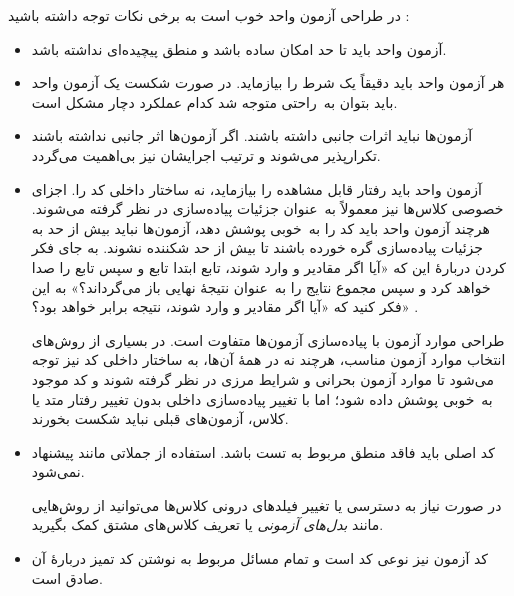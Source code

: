 \documentclass{utap}
\begin{document}
    \par در طراحی آزمون واحد خوب است به برخی نکات توجه داشته باشید \cite{dietrich14}:
    \begin{itemize}[nosep]
        \item آزمون واحد باید تا حد امکان ساده باشد و منطق پیچیده‌ای نداشته باشد.
        \item هر آزمون واحد باید دقیقاً یک شرط را بیازماید. در صورت شکست یک آزمون واحد باید بتوان به~راحتی متوجه شد کدام عملکرد دچار مشکل است.
        \item آزمون‌ها نباید اثرات جانبی داشته باشند. اگر آزمون‌ها اثر جانبی نداشته باشند تکرارپذیر می‌شوند و ترتیب اجرایشان نیز بی‌اهمیت می‌گردد.
        \item آزمون واحد باید رفتار قابل مشاهده را بیازماید، نه ساختار داخلی کد را. اجزای خصوصی کلاس‌ها نیز معمولاً به~عنوان جزئیات پیاده‌سازی در نظر گرفته می‌شوند.
        هرچند آزمون واحد باید کد را به~خوبی پوشش دهد، آزمون‌ها نباید بیش از حد به جزئیات پیاده‌سازی گره خورده باشند تا بیش از حد شکننده نشوند. به جای فکر کردن دربارهٔ  این که «آیا اگر مقادیر  و  وارد شوند، تابع ابتدا تابع  و سپس تابع  را صدا خواهد کرد و سپس مجموع نتایج را به~عنوان نتیجهٔ نهایی باز می‌گرداند؟» به این فکر کنید که «آیا اگر مقادیر  و  وارد شوند، نتیجه برابر  خواهد بود؟» \cite{vocke18}.\par
        طراحی موارد آزمون با پیاده‌سازی آزمون‌ها متفاوت است. در بسیاری از روش‌های انتخاب موارد آزمون مناسب، هرچند نه در همهٔ آن‌ها، به ساختار داخلی کد نیز توجه می‌شود تا موارد آزمون بحرانی و شرایط مرزی در نظر گرفته شوند و کد موجود به~خوبی پوشش داده شود؛ اما با تغییر پیاده‌سازی داخلی بدون تغییر رفتار متد یا کلاس، آزمون‌های قبلی نباید شکست بخورند.
        \item کد اصلی باید فاقد منطق مربوط به تست باشد. استفاده از جملاتی مانند  پیشنهاد نمی‌شود.\par
        در صورت نیاز به دسترسی یا تغییر فیلدهای درونی کلاس‌ها می‌توانید از روش‌هایی مانند \textit{بدل‌های آزمونی} یا تعریف کلاس‌های مشتق کمک بگیرید.
        \item کد آزمون نیز نوعی کد است و تمام مسائل مربوط به نوشتن کد تمیز دربارهٔ آن صادق است.
    \end{itemize}
\end{document}

